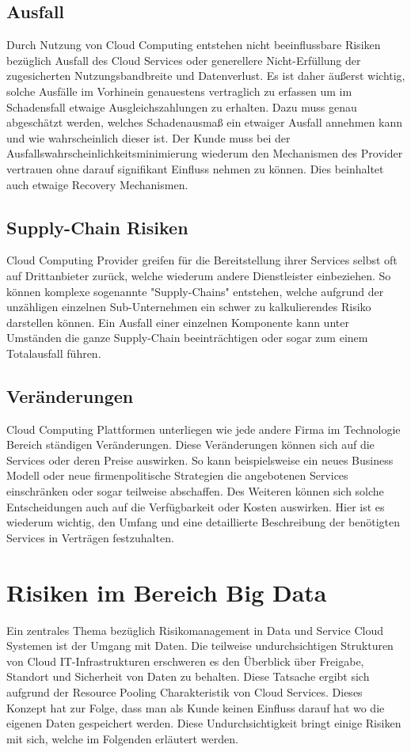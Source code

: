 \documentclass{report}
\begin{document}
\subsection{Ausfall}
Durch Nutzung von Cloud Computing entstehen nicht beeinflussbare Risiken bezüglich Ausfall des Cloud Services oder generellere Nicht-Erfüllung der zugesicherten Nutzungsbandbreite und Datenverlust. Es ist daher äußerst wichtig, solche Ausfälle im Vorhinein genauestens vertraglich zu erfassen um im Schadensfall etwaige Ausgleichszahlungen zu erhalten. Dazu muss genau abgeschätzt werden, welches Schadenausmaß ein etwaiger Ausfall annehmen kann und wie wahrscheinlich dieser ist. Der Kunde muss bei der Ausfallswahrscheinlichkeitsminimierung wiederum den Mechanismen des Provider vertrauen ohne darauf signifikant Einfluss nehmen zu können. Dies beinhaltet auch etwaige Recovery Mechanismen.  

\subsection{Supply-Chain Risiken}
Cloud Computing Provider greifen für die Bereitstellung ihrer Services selbst oft auf Drittanbieter zurück, welche wiederum andere Dienstleister einbeziehen. So können komplexe sogenannte "Supply-Chains" entstehen, welche aufgrund der unzähligen einzelnen Sub-Unternehmen ein schwer zu kalkulierendes Risiko darstellen können. Ein Ausfall einer einzelnen Komponente kann unter Umständen die ganze Supply-Chain beeinträchtigen oder sogar zum einem Totalausfall führen.  \cite{haa2013}

\subsection{Veränderungen}
Cloud Computing Plattformen unterliegen wie jede andere Firma im Technologie Bereich ständigen Veränderungen. Diese Veränderungen können sich auf die Services oder deren Preise auswirken. So kann beispielsweise ein neues Business Modell oder neue firmenpolitische Strategien die angebotenen Services einschränken oder sogar teilweise abschaffen. Des Weiteren können sich solche Entscheidungen auch auf die Verfügbarkeit oder Kosten auswirken. Hier ist es wiederum wichtig, den Umfang und eine detaillierte Beschreibung der benötigten Services in Verträgen festzuhalten. \cite{mos2011}


\section{Risiken im Bereich Big Data}
Ein zentrales Thema bezüglich Risikomanagement in Data und Service Cloud Systemen ist der Umgang mit Daten. Die teilweise undurchsichtigen Strukturen von Cloud IT-Infrastrukturen erschweren es den Überblick über Freigabe, Standort und Sicherheit von Daten zu behalten. Diese Tatsache ergibt sich aufgrund der Resource Pooling Charakteristik von Cloud Services. Dieses Konzept hat zur Folge, dass man als Kunde keinen Einfluss darauf hat wo die eigenen Daten gespeichert werden. Diese Undurchsichtigkeit bringt einige Risiken mit sich, welche im Folgenden erläutert werden. 
\end{document}
